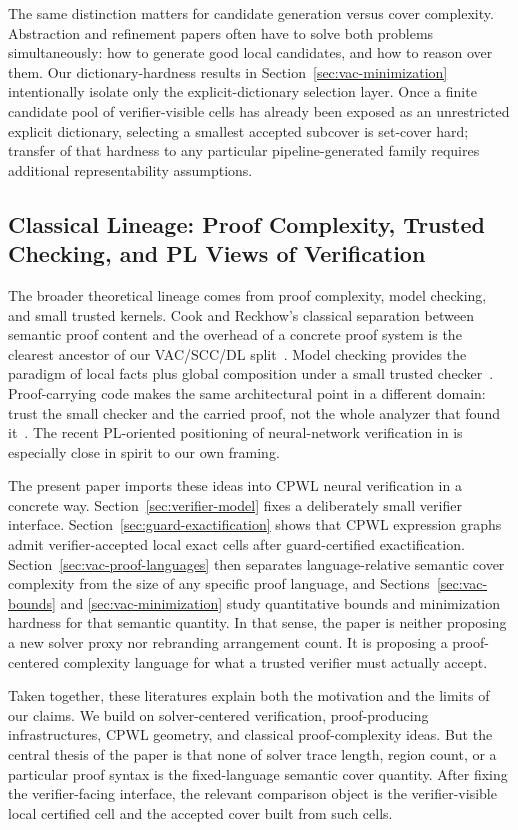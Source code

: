 The same distinction matters for candidate generation versus cover complexity. Abstraction and refinement papers often have to solve both problems simultaneously: how to generate good local candidates, and how to reason over them. Our dictionary-hardness results in Section~\ref{sec:vac-minimization} intentionally isolate only the explicit-dictionary selection layer. Once a finite candidate pool of verifier-visible cells has already been exposed as an unrestricted explicit dictionary, selecting a smallest accepted subcover is set-cover hard; transfer of that hardness to any particular pipeline-generated family requires additional representability assumptions.

\subsection{Classical Lineage: Proof Complexity, Trusted Checking, and PL Views of Verification}

The broader theoretical lineage comes from proof complexity, model checking, and small trusted kernels. Cook and Reckhow's classical separation between semantic proof content and the overhead of a concrete proof system is the clearest ancestor of our VAC/SCC/DL split~\cite{CookReckhow1979}. Model checking provides the paradigm of local facts plus global composition under a small trusted checker~\cite{Clarke1999ModelChecking}. Proof-carrying code makes the same architectural point in a different domain: trust the small checker and the carried proof, not the whole analyzer that found it~\cite{Necula1997PCC}. The recent PL-oriented positioning of neural-network verification in \cite{Cordeiro2025PLChallenge} is especially close in spirit to our own framing.

The present paper imports these ideas into CPWL neural verification in a concrete way. Section~\ref{sec:verifier-model} fixes a deliberately small verifier interface. Section~\ref{sec:guard-exactification} shows that CPWL expression graphs admit verifier-accepted local exact cells after guard-certified exactification. Section~\ref{sec:vac-proof-languages} then separates language-relative semantic cover complexity from the size of any specific proof language, and Sections~\ref{sec:vac-bounds} and \ref{sec:vac-minimization} study quantitative bounds and minimization hardness for that semantic quantity. In that sense, the paper is neither proposing a new solver proxy nor rebranding arrangement count. It is proposing a proof-centered complexity language for what a trusted verifier must actually accept.

Taken together, these literatures explain both the motivation and the limits of our claims. We build on solver-centered verification, proof-producing infrastructures, CPWL geometry, and classical proof-complexity ideas. But the central thesis of the paper is that none of solver trace length, region count, or a particular proof syntax is the fixed-language semantic cover quantity. After fixing the verifier-facing interface, the relevant comparison object is the verifier-visible local certified cell and the accepted cover built from such cells.
